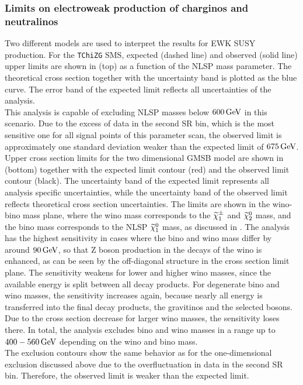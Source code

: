 \subsubsection*{Limits on electroweak production of charginos and neutralinos}
Two different models are used to interpret the results for EWK SUSY production. For the \texttt{TChiZG} SMS, expected (dashed line) and observed (solid line) upper limits are shown in  (top) as a function of the NLSP mass parameter. The theoretical cross section together with the uncertainty band is plotted as the blue curve.
The error band of the expected limit reflects all uncertainties of the analysis.\\
This analysis is capable of excluding NLSP masses below $600\,\text{Ge\hspace{-.08em}V}$ in this scenario. Due to the excess of data in the second SR bin, which is the most sensitive one for all signal points of this parameter scan, the observed limit is approximately one standard deviation weaker than the expected limit of $675\,\text{Ge\hspace{-.08em}V}$.\\
Upper cross section limits for the two dimensional GMSB model are shown in  (bottom) together with the expected limit contour (red) and the observed limit contour (black). The uncertainty band of the expected limit represents all analysis specific uncertainties, while the uncertainty band of the observed limit reflects theoretical cross section uncertainties. The limits are shown in the wino-bino mass plane, where the wino mass corresponds to the $\widetilde{\chi}^\pm_{1}$ and $\widetilde{\chi}^{0}_{2}$ mass, and the bino mass corresponds to the NLSP $\widetilde{\chi}^{0}_{1}$ mass, as discussed in . The analysis has the highest sensitivity in cases where the bino and wino mass differ by around $90\,\text{Ge\hspace{-.08em}V}$, so that Z boson production in the decays of the wino is enhanced, as can be seen by the off-diagonal structure in the cross section limit plane. The sensitivity weakens for lower and higher wino masses, since the available energy is split between all decay products. For degenerate bino and wino masses, the sensitivity increases again, because nearly all energy is transferred into the final decay products, the gravitinos and the selected bosons. Due to the cross section decrease for larger wino masses, the sensitivity loses there. In total, the analysis excludes bino and wino masses in a range up to $400-560\,\text{Ge\hspace{-.08em}V}$ depending on the wino and bino mass.\\
The exclusion contours show the same behavior as for the one-dimensional exclusion discussed above due to the overfluctuation in data in the second SR bin. Therefore, the observed limit is weaker than the expected limit.
